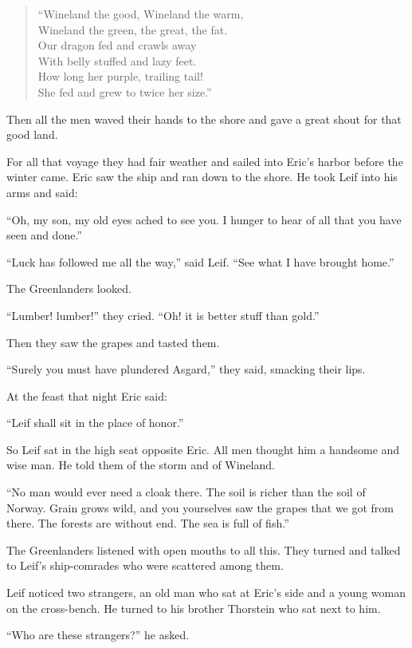 \begin{quote}
``Wineland the good, Wineland the warm,\\
Wineland the green, the great, the fat.\\
Our dragon fed and crawls away\\
With belly stuffed and lazy feet.\\
How long her purple, trailing tail!\\
She fed and grew to twice her size.''
\end{quote}

Then all the men waved their hands to the shore and gave a great shout
for that good land.

For all that voyage they had fair weather and sailed into Eric's harbor
before the winter came. Eric saw the ship and ran down to the shore. He
took Leif into his arms and said:

``Oh, my son, my old eyes ached to see you. I hunger to hear of all that
you have seen and done.''

``Luck has followed me all the way,'' said Leif. ``See what I have
brought home.''

The Greenlanders looked.

``Lumber! lumber!'' they cried. ``Oh! it is better stuff than gold.''

Then they saw the grapes and tasted them.

``Surely you must have plundered Asgard,'' they said, smacking their
lips.

At the feast that night Eric said:

``Leif shall sit in the place of honor.''

So Leif sat in the high seat opposite Eric. All men thought him a
handsome and wise man. He told them of the storm and of Wineland.

``No man would ever need a cloak there. The soil is richer than the soil
of Norway. Grain grows wild, and you yourselves saw the grapes that we
got from there. The forests are without end. The sea is full of fish.''

The Greenlanders listened with open mouths to all this. They turned and
talked to Leif's ship-comrades who were scattered among them.

Leif noticed two strangers, an old man who sat at Eric's side and a
young woman on the cross-bench. He turned to his brother Thorstein who
sat next to him.

``Who are these strangers?'' he asked.

